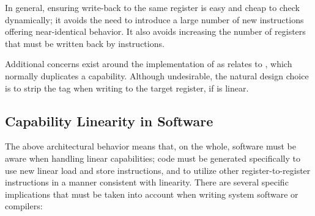 In general, ensuring write-back to the same register is easy and cheap to
check dynamically; it avoids the need to introduce a large number of new
instructions offering near-identical behavior.
It also avoids increasing the number of registers that must be written back
by instructions.

Additional concerns exist around the implementation of \PCC{} as relates to
, which normally duplicates a capability.
Although undesirable, the natural design choice is to strip the tag when
writing to the target register, if \PCC{} is linear.

\subsection{Capability Linearity in Software}

The above architectural behavior means that, on the whole, software must
be aware when handling linear capabilities; code must be generated
specifically to use new linear load and store instructions, and to utilize
other register-to-register instructions in a manner consistent with linearity.
There are several specific implications that must be taken into account
when writing system software or compilers:

